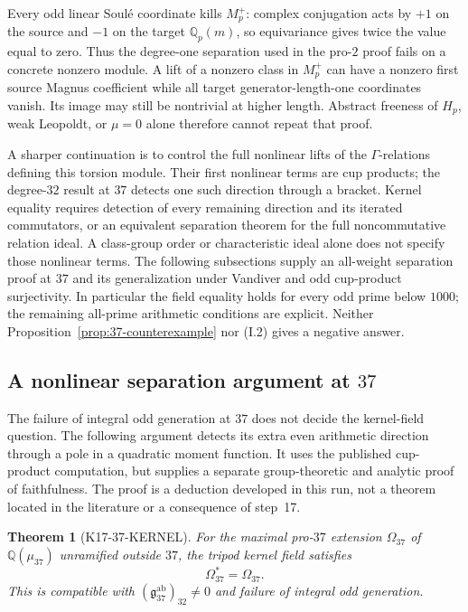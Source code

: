 \documentclass[11pt,a4paper]{article}
\newtheorem{theorem}{Theorem}[section]
\theoremstyle{definition}
\begin{document}
Every odd linear Soul\'e coordinate kills $M_p^+$: complex conjugation acts by $+1$ on the source and $-1$ on the target $\mathbb Q_p(m)$, so equivariance gives twice the value equal to zero. Thus the degree-one separation used in the pro-$2$ proof fails on a concrete nonzero module. A lift of a nonzero class in $M_p^+$ can have a nonzero first source Magnus coefficient while all target generator-length-one coordinates vanish. Its image may still be nontrivial at higher length. Abstract freeness of $H_p$, weak Leopoldt, or $\mu=0$ alone therefore cannot repeat that proof.

A sharper continuation is to control the full nonlinear lifts of the $\Gamma$-relations defining this torsion module. Their first nonlinear terms are cup products; the degree-$32$ result at $37$ detects one such direction through a bracket. Kernel equality requires detection of every remaining direction and its iterated commutators, or an equivalent separation theorem for the full noncommutative relation ideal. A class-group order or characteristic ideal alone does not specify those nonlinear terms. The following subsections supply an all-weight separation proof at $37$ and its generalization under Vandiver and odd cup-product surjectivity. In particular the field equality holds for every odd prime below $1000$; the remaining all-prime arithmetic conditions are explicit. Neither Proposition~\ref{prop:37-counterexample} nor (I.2) gives a negative answer.

\subsection{A nonlinear separation argument at \texorpdfstring{$37$}{37}}
\label{sec:kernel37-poles}

The failure of integral odd generation at $37$ does not decide the kernel-field question. The following argument detects its extra even arithmetic direction through a pole in a quadratic moment function. It uses the published cup-product computation, but supplies a separate group-theoretic and analytic proof of faithfulness. The proof is a deduction developed in this run, not a theorem located in the literature or a consequence of step~17.

\begin{theorem}[K17-37-KERNEL]\label{thm:kernel37-poles}
For the maximal pro-$37$ extension $\Omega_{37}$ of $\mathbb Q(\mu_{37})$ unramified outside $37$, the tripod kernel field satisfies
\[
 \Omega_{37}^*=\Omega_{37}.
\]
This is compatible with $(\mathfrak g_{37}^{\mathrm{ab}})_{32}\ne0$ and failure of integral odd generation.
\end{theorem}
\end{document}
